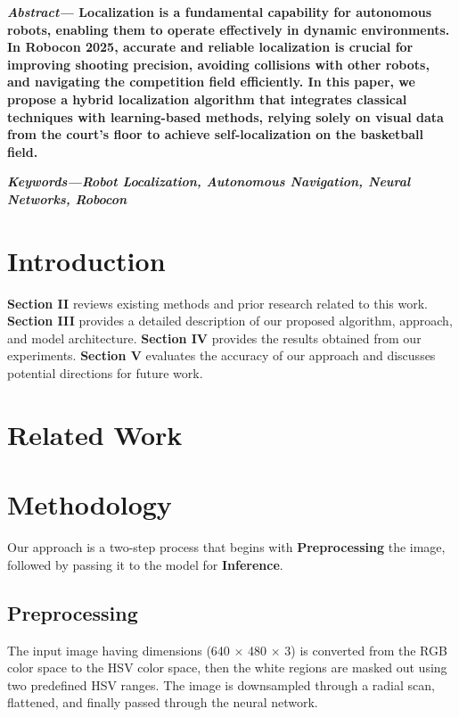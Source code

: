 \documentclass[a4paper]{article}
\begin{document}
\begin{multicols}{2}
\setlength{\columnsep}{0.5cm}

\noindent \textbf{\textit{Abstract---}
Localization is a fundamental capability for autonomous robots, enabling them 
to operate effectively in dynamic environments. In Robocon 2025, accurate and 
reliable localization is crucial for improving shooting precision, avoiding 
collisions with other robots, and navigating the competition field efficiently. 
In this paper, we propose a hybrid localization algorithm that integrates classical 
techniques with learning-based methods, relying solely on visual data from the court’s
floor to achieve self-localization on the basketball field.
}

\small	
\noindent \textbf{
  \textit{Keywords---}\textit{Robot Localization, Autonomous Navigation, Neural Networks, Robocon}}

\section{Introduction}
\par \noindent
\textbf{Section II} reviews existing methods and prior research related to this work. 
\textbf{Section III} provides a detailed description of our proposed algorithm, approach, and model architecture. 
\textbf{Section IV} provides the results obtained from our experiments. 
\textbf{Section V} evaluates the accuracy of our approach and discusses potential directions for future work.


\section{Related Work}

\section{Methodology}
\par \noindent Our approach is a two-step process that begins with \textbf{Preprocessing} the image,
followed by passing it to the model for \textbf{Inference}.
\subsection{Preprocessing}
\par \noindent The input image having dimensions (640 $\times$ 480 $\times$ 3) is converted from the RGB color space to the HSV color space, then the white regions are masked out using two predefined HSV ranges.
The image is downsampled through a radial scan, flattened, and finally passed through the neural network.


\end{multicols}
\end{document}

